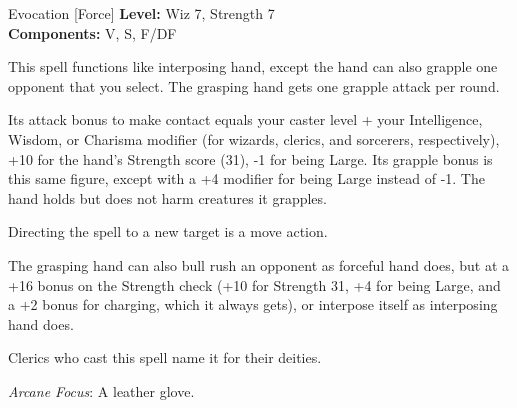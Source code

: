 {Evocation [Force]}
{
	\textbf{Level:}
	Wiz 7, Strength 7\\
	\textbf{Components:}
	V, S, F/DF\\
}
{
	This spell functions like interposing hand, except the hand can also grapple one opponent that you select. The grasping hand gets one grapple attack per round.

	Its attack bonus to make contact equals your caster level + your Intelligence, Wisdom, or Charisma modifier (for wizards, clerics, and sorcerers, respectively), +10 for the hand's Strength score (31), -1 for being Large. Its grapple bonus is this same figure, except with a +4 modifier for being Large instead of -1. The hand holds but does not harm creatures it grapples.

	Directing the spell to a new target is a move action.

	The grasping hand can also bull rush an opponent as forceful hand does, but at a +16 bonus on the Strength check (+10 for Strength 31, +4 for being Large, and a +2 bonus for charging, which it always gets), or interpose itself as interposing hand does.

Clerics who cast this spell name it for their deities.

	\textit{Arcane Focus}:
	A leather glove.

}
